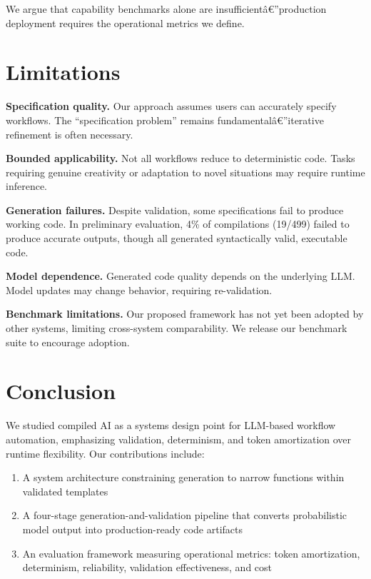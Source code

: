 \documentclass[11pt]{article}
\begin{document}
We argue that capability benchmarks alone are insufficientâ€”production deployment requires the operational metrics we define.

\section{Limitations}
\label{sec:limitations}

\textbf{Specification quality.} Our approach assumes users can accurately specify workflows. The ``specification problem'' remains fundamentalâ€”iterative refinement is often necessary.

\textbf{Bounded applicability.} Not all workflows reduce to deterministic code. Tasks requiring genuine creativity or adaptation to novel situations may require runtime inference.

\textbf{Generation failures.} Despite validation, some specifications fail to produce working code. In preliminary evaluation, 4\% of compilations (19/499) failed to produce accurate outputs, though all generated syntactically valid, executable code.

\textbf{Model dependence.} Generated code quality depends on the underlying LLM. Model updates may change behavior, requiring re-validation.

\textbf{Benchmark limitations.} Our proposed framework has not yet been adopted by other systems, limiting cross-system comparability. We release our benchmark suite to encourage adoption.

\section{Conclusion}
\label{sec:conclusion}

We studied compiled AI as a systems design point for LLM-based workflow automation, emphasizing validation, determinism, and token amortization over runtime flexibility. Our contributions include:

\begin{enumerate}
    \item A system architecture constraining generation to narrow functions within validated templates
    \item A four-stage generation-and-validation pipeline that converts probabilistic model output into production-ready code artifacts
    \item An evaluation framework measuring operational metrics: token amortization, determinism, reliability, validation effectiveness, and cost
\end{enumerate}
\end{document}
